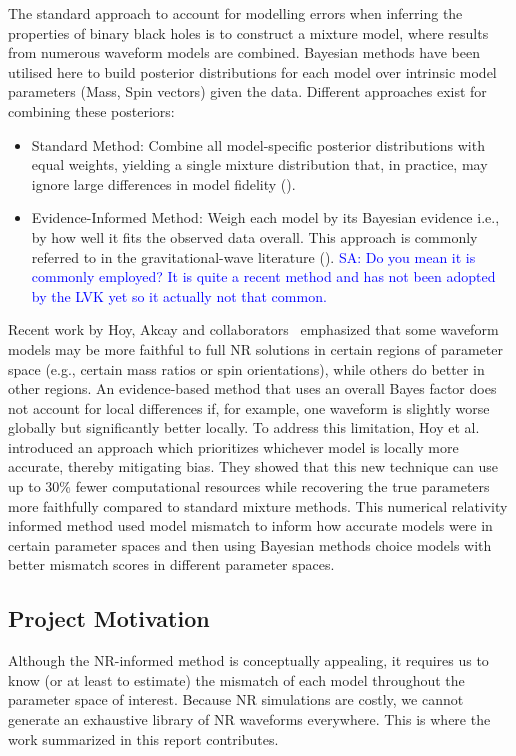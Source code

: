 \documentclass[12pt]{article}
\newcommand{\Sarp}[1]{{\textcolor{blue}{{SA: #1}} }}
\begin{document}
The standard approach to account for modelling errors when inferring the properties of binary black holes is to construct a mixture model, where results from numerous waveform models are combined.
Bayesian methods have been utilised here to build posterior distributions for each model over intrinsic model parameters (Mass, Spin vectors) given the data. Different approaches exist for combining these posteriors:
\begin{itemize}
    \item Standard Method: Combine all model-specific posterior distributions with equal weights, yielding a single mixture distribution that, in practice, may ignore large differences in model fidelity (\cite{linearcombination}).
    \item Evidence-Informed Method: Weigh each model by its Bayesian evidence i.e., by how well it fits the observed data overall. This approach is commonly referred to in the gravitational-wave literature (\cite{Bayesianapproach}).
    \Sarp{Do you mean it is commonly employed? It is quite a recent method and has not been adopted by the LVK yet so it actually not that common.}
\end{itemize}

Recent work by Hoy, Akcay and collaborators~\cite{Ogpaper} emphasized that some waveform models may be more faithful to full NR solutions in certain regions of parameter space (e.g., certain mass ratios or spin orientations),
while others do better in other regions. An evidence-based method that uses an overall Bayes factor does not account for local differences if, for example, one waveform is slightly worse globally but significantly better locally.
To address this limitation, Hoy et al.\cite{Ogpaper} introduced an approach which prioritizes whichever model is locally more accurate, thereby mitigating bias.
They showed that this new technique can use up to 30\% fewer computational resources while recovering the true parameters more faithfully compared to standard mixture methods.
This numerical relativity informed method used model mismatch to inform how accurate models were in certain parameter spaces and then using Bayesian methods choice models with better 
mismatch scores in different parameter spaces.


\subsection{Project Motivation}
Although the NR-informed method is conceptually appealing, it requires us to know (or at least to estimate) 
the mismatch of each model throughout the parameter space of interest. Because
NR simulations are costly, we cannot generate an exhaustive library of NR waveforms
everywhere. This is where the work summarized in this report contributes.
\end{document}
